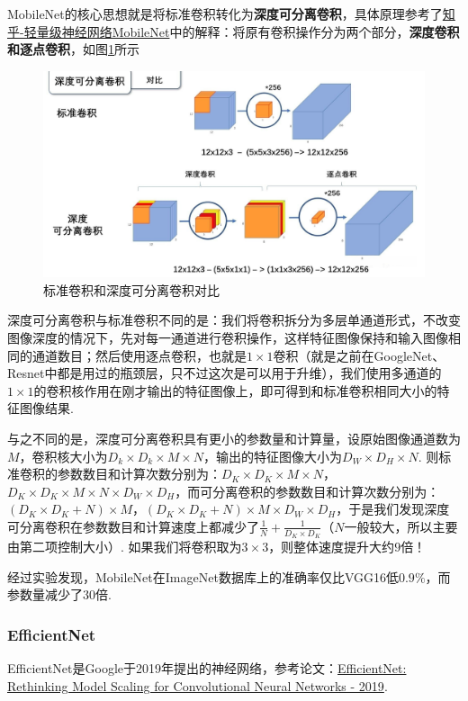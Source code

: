 \documentclass[12pt, a4paper, oneside]{ctexart}
\numberwithin{equation}{section}  %
\def\add{\vspace{1ex}}      %
\begin{document}
MobileNet的核心思想就是将标准卷积转化为\textbf{深度可分离卷积}，具体原理参考了\href{https://zhuanlan.zhihu.com/p/70703846}{知乎-轻量级神经网络MobileNet}中的解释：将原有卷积操作分为两个部分，\textbf{深度卷积和逐点卷积}，如图\ref{fig-MobileNet}所示
\begin{figure}[htbp]
  \centering
  \includegraphics[scale=0.4]{深度可分离卷积.jpg}
  \caption{标准卷积和深度可分离卷积对比}
  \label{fig-MobileNet}
\end{figure}

深度可分离卷积与标准卷积不同的是：我们将卷积拆分为多层单通道形式，不改变图像深度的情况下，先对每一通道进行卷积操作，这样特征图像保持和输入图像相同的通道数目；然后使用逐点卷积，也就是$1\times 1$卷积（就是之前在GoogleNet、Resnet中都是用过的瓶颈层，只不过这次是可以用于升维），我们使用多通道的$1\times 1$的卷积核作用在刚才输出的特征图像上，即可得到和标准卷积相同大小的特征图像结果.

与之不同的是，深度可分离卷积具有更小的参数量和计算量，设原始图像通道数为$M$，卷积核大小为$D_k\times D_k\times M\times N$，输出的特征图像大小为$D_W\times D_H\times N$. 则标准卷积的参数数目和计算次数分别为：$D_K\times D_K\times M\times N$，$D_K\times D_K\times M\times N\times D_W\times D_H$，而可分离卷积的参数数目和计算次数分别为：\add $(D_K\times D_K+N)\times M$，$(D_K\times D_K+N)\times M\times D_W\times D_H$，\add 于是我们发现深度可分离卷积在参数数目和计算速度上都减少了$\frac{1}{N}+\frac{1}{D_K\times D_K}$（$N$一般较大，所以主要由第二项控制大小）. 如果我们将卷积取为$3\times 3$，则整体速度提升大约$9$倍！

经过实验发现，MobileNet在ImageNet数据库上的准确率仅比VGG16低$0.9\%$，而参数量减少了$30$倍.

\subsubsection{EfficientNet}
EfficientNet是Google于2019年提出的神经网络，参考论文：\href{https://arxiv.org/pdf/1905.11946v5.pdf}{EfficientNet: Rethinking Model Scaling for Convolutional Neural Networks - 2019}.
\end{document}
